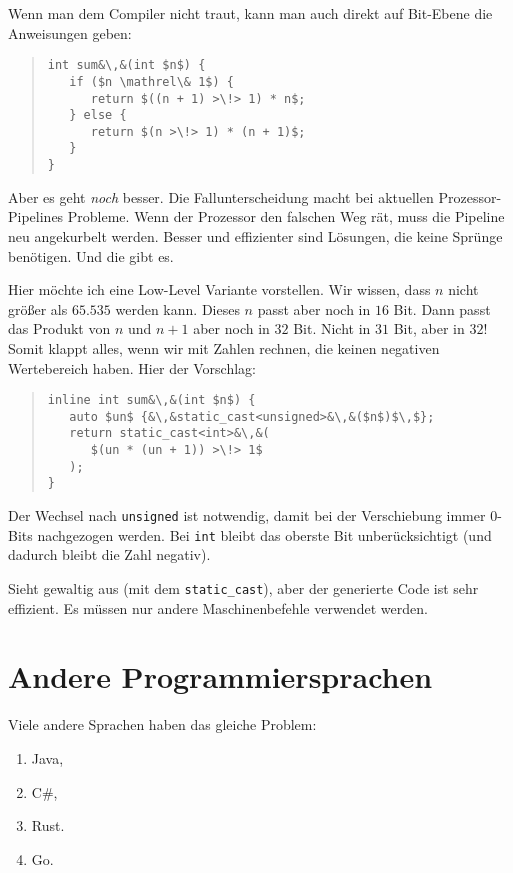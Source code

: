 \documentclass[a5paper,landscape,ngerman,10pt]{article}
\begin{document}
Wenn man dem Compiler nicht traut, kann man auch direkt
auf Bit-Ebene die Anweisungen geben:

\begin{quotation}
\begin{lstlisting}
int sum&\,&(int $n$) {
   if ($n \mathrel\& 1$) {
      return $((n + 1) >\!> 1) * n$;
   } else {
      return $(n >\!> 1) * (n + 1)$;
   }
}
\end{lstlisting}
\end{quotation}

Aber es geht {\it noch\/} besser.
Die Fallunterscheidung macht bei aktuellen Prozessor-Pipelines
Probleme.
Wenn der Prozessor den falschen Weg rät, muss die
Pipeline neu angekurbelt werden.
Besser und effizienter sind Lösungen, die keine
Sprünge benötigen.
Und die gibt es.

Hier möchte ich eine Low-Level Variante vorstellen.
Wir wissen, dass $n$ nicht größer als $65.535$ werden
kann.
Dieses $n$ passt aber noch in $16$ Bit.
Dann passt das Produkt von $n$ und $n+1$ aber noch in
$32$ Bit.
Nicht in $31$ Bit, aber in $32$!
Somit klappt alles, wenn wir mit Zahlen rechnen, die
keinen negativen Wertebereich haben.
Hier der Vorschlag:

\begin{quotation}
\begin{lstlisting}
inline int sum&\,&(int $n$) {
   auto $un$ {&\,&static_cast<unsigned>&\,&($n$)$\,$};
   return static_cast<int>&\,&(
      $(un * (un + 1)) >\!> 1$
   );
}
\end{lstlisting}
\end{quotation}

Der Wechsel nach \lstinline!unsigned! ist notwendig, damit
bei der Verschiebung immer $0$-Bits nachgezogen werden.
Bei \lstinline!int! bleibt das oberste Bit unberücksichtigt
(und dadurch bleibt die Zahl negativ).

Sieht gewaltig aus (mit dem \lstinline!static_cast!), aber
der generierte Code ist sehr effizient.
Es müssen nur andere Maschinenbefehle verwendet werden.

\section{Andere Programmiersprachen}

Viele andere Sprachen haben das gleiche Problem:

\begin{enumerate}
 \item Java,
 \item C\#,
 \item Rust.
 \item Go.
\end{enumerate}
\end{document}
